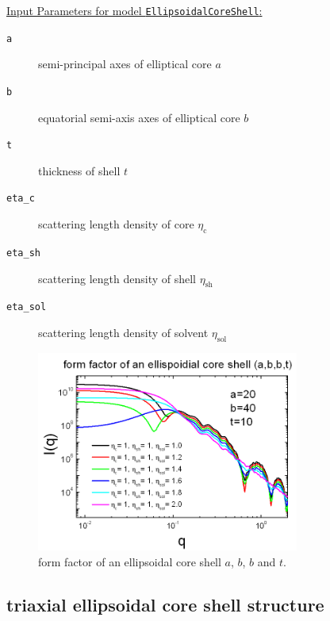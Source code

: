 \vspace{0.5cm}

\underline{Input Parameters for model \texttt{EllipsoidalCoreShell}:}
\begin{description}
\item[\texttt{a}] semi-principal axes of elliptical core $a$
\item[\texttt{b}] equatorial semi-axis axes of elliptical core $b$
\item[\texttt{t}] thickness of shell $t$
\item[\texttt{eta\_c}] scattering length density of core $\eta_\text{c}$
\item[\texttt{eta\_sh}] scattering length density of shell $\eta_\text{sh}$
\item[\texttt{eta\_sol}] scattering length density of solvent $\eta_\text{sol}$
\end{description}

\begin{figure}[htb]
\begin{center}
\includegraphics[width=0.768\textwidth,height=0.588\textwidth]{../images/form_factor/Ellipsoid/ellipsoidal_core_shell.png}
\end{center}
\caption{form factor of an ellipsoidal core shell $a$, $b$, $b$ and
$t$.} \label{fig:I_ellipsoidal_core_shell}
\end{figure}
\clearpage
\subsection{triaxial ellipsoidal core shell structure}
\label{sect:triaxEllShell1} ~\\

